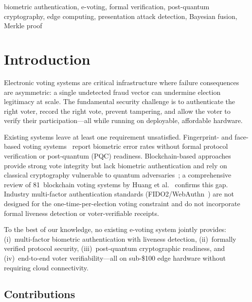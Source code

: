 \documentclass[conference]{IEEEtran}
\begin{document}
\begin{IEEEkeywords}
biometric authentication, e-voting, formal verification,
post-quantum cryptography, edge computing, presentation attack detection,
Bayesian fusion, Merkle proof
\end{IEEEkeywords}

\section{Introduction}
\label{sec:intro}

Electronic voting systems are critical infrastructure where failure
consequences are asymmetric: a single undetected fraud vector can undermine
election legitimacy at scale. The fundamental security challenge is to
authenticate the right voter, record the right vote, prevent tampering,
and allow the voter to verify their participation—all while running on
deployable, affordable hardware.

Existing systems leave at least one requirement unsatisfied.
Fingerprint- and face-based voting systems~\cite{bello2021biometric,
sanchez2020biometric,komatineni2020biometric,nagaraj2022voting} report
biometric error rates without formal protocol
verification or post-quantum (PQC) readiness. Blockchain-based
approaches~\cite{ayed2017conceptual,hardwick2018voting,faruk2024transforming}
provide strong vote
integrity but lack biometric authentication and rely on classical cryptography
vulnerable to quantum adversaries~\cite{bernstein2017post}; a
comprehensive review of 81~blockchain voting systems by Huang et
al.~\cite{huang2022blockchain_voting} confirms this gap. Industry
multi-factor authentication standards (FIDO2/WebAuthn~\cite{fido2_webauthn})
are not designed for the one-time-per-election voting constraint and do not
incorporate formal liveness detection or voter-verifiable receipts.

To the best of our knowledge, no existing e-voting system jointly provides:
(i)~multi-factor
biometric authentication with liveness detection, (ii)~formally verified
protocol security, (iii)~post-quantum cryptographic readiness, and
(iv)~end-to-end voter verifiability—all on sub-\$100 edge hardware without
requiring cloud connectivity.

\subsection*{Contributions}
\end{document}
